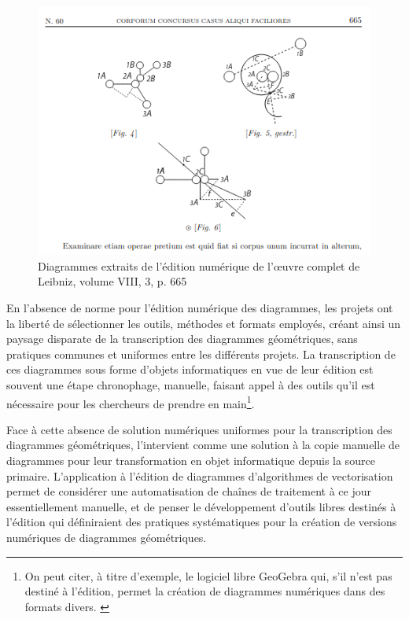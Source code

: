 		\begin{figure}[h]
			\centering
			\includegraphics[width=15cm]{images/leibniz_diag.png}
			\caption{Diagrammes extraits de l'édition numérique de l'œuvre complet de Leibniz, volume VIII, 3, p. 665}
			\label{fig:leibniz_diag}
		\end{figure}
	
		En l'absence de norme pour l'édition numérique des diagrammes, les projets ont la liberté de sélectionner les outils, méthodes et formats employés, créant ainsi un paysage disparate de la transcription des diagrammes géométriques, sans pratiques communes et uniformes entre les différents projets. La transcription de ces diagrammes sous forme d'objets informatiques en vue de leur édition est souvent une étape chronophage, manuelle, faisant appel à des outils qu'il est nécessaire pour les chercheurs de prendre en main\footnote{On peut citer, à titre d'exemple, le logiciel libre GeoGebra qui, s'il n'est pas destiné à l'édition, permet la création de diagrammes numériques dans des formats divers. \cite{GeoGebraApplicationsMathematiques}}.
		
		Face à cette absence de solution numériques uniformes pour la transcription des diagrammes géométriques, l'\ia intervient comme une solution à la copie manuelle de diagrammes pour leur transformation en objet informatique depuis la source primaire. L'application à l'édition de diagrammes d'algorithmes de vectorisation permet de considérer une automatisation de chaînes de traitement à ce jour essentiellement manuelle, et de penser le développement d'outils libres destinés à l'édition qui définiraient des pratiques systématiques pour la création de versions numériques de diagrammes géométriques.

